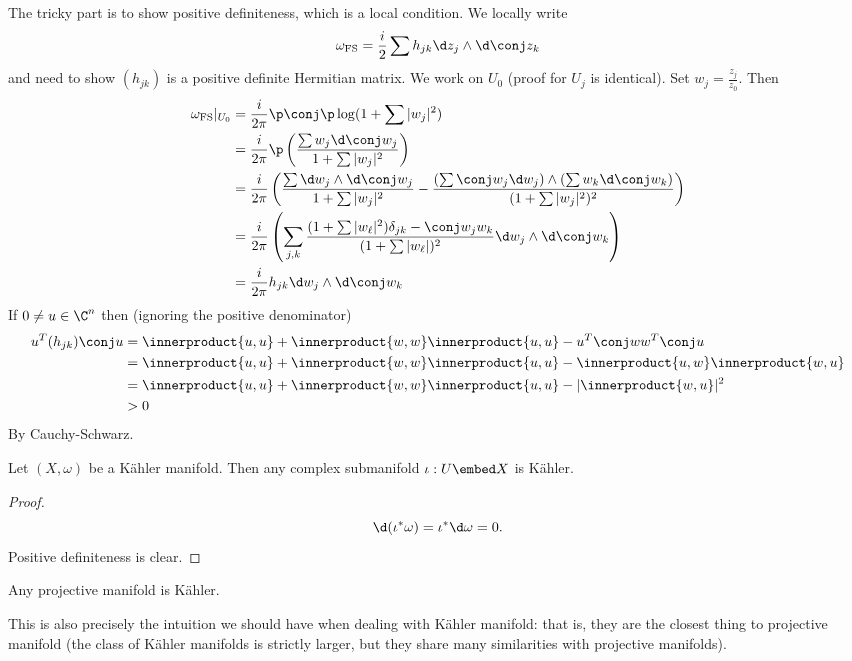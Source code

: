 \documentclass[a4paper]{article}
\renewcommand{\P}{\mathbb P} %
\newcommand{\w}{\wedge} %
\newcommand*{\ip}{\innerproduct}
\begin{document}
\begin{eg}[Fubini-Study metric on \(\P^n\)]
  The tricky part is to show positive definiteness, which is a local condition. We locally write
  \[
    \omega_{\text{FS}} = \frac{i}{2} \sum h_{jk} \d z_j \w \d \conj z_k
  \]
  and need to show \((h_{jk})\) is a positive definite Hermitian matrix. We work on \(U_0\) (proof for \(U_j\) is identical). Set \(w_j = \frac{z_j}{z_0}\). Then
  \begin{align*}
    \omega_{\text{FS}}|_{U_0}
    &= \frac{i}{2\pi} \p \conj \p \log (1 + \sum |w_j|^2) \\
    &= \frac{i}{2\pi} \p \left( \frac{\sum w_j \d \conj w_j}{1 + \sum |w_j|^2} \right) \\
    &= \frac{i}{2\pi} \left( \frac{\sum \d w_j \w \d \conj w_j}{1 + \sum |w_j|^2} - \frac{(\sum \conj w_j \d w_j) \w (\sum w_k \d \conj w_k)}{(1 + \sum |w_j|^2)^2} \right) \\
    &= \frac{i}{2\pi} \left( \sum_{j,k} \frac{(1 + \sum |w_\ell|^2) \delta_{jk} - \conj w_j w_k}{(1 + \sum |w_\ell|)^2} \d w_j \w \d \conj w_k \right) \\
    &= \frac{i}{2\pi} h_{jk} \d w_j \w \d \conj w_k
  \end{align*}
  If \(0 \neq u \in \C^n\) then (ignoring the positive denominator)
  \begin{align*}
    u^T (h_{jk}) \conj u
    &= \ip{u, u} + \ip{w, w} \ip{u, u} - u^T \conj w w^T \conj u \\
    &= \ip{u, u} + \ip{w, w} \ip{u, u} - \ip{u, w} \ip{w, u} \\
    &= \ip{u, u} + \ip{w, w} \ip{u, u} - |\ip{w, u}|^2 \\
    &> 0
  \end{align*}
  By Cauchy-Schwarz.
\end{eg}

\begin{proposition}
  Let \((X, \omega)\) be a Kähler manifold. Then any complex submanifold \(\iota: U \embed X\) is Kähler.
\end{proposition}

\begin{proof}
  \[
    \d (\iota^* \omega) = \iota^* \d \omega = 0.
  \]
  Positive definiteness is clear.
\end{proof}

\begin{corollary}
  Any projective manifold is Kähler.
\end{corollary}

This is also precisely the intuition we should have when dealing with Kähler manifold: that is, they are the closest thing to projective manifold (the class of Kähler manifolds is strictly larger, but they share many similarities with projective manifolds).
\end{document}
